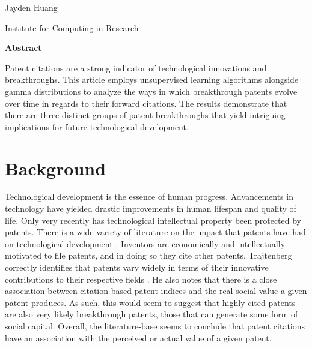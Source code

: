 \begin{center}
\vspace{4pt}
\large
    Jayden Huang
    
\small
   Institute for Computing in Research 

\end{center}



\begin{small}
\begin{center}
\vspace{9pt}
\textbf{Abstract}    
\end{center}

\begin{adjustwidth}{20pt}{20pt}
\small \noindent Patent citations are a strong indicator of technological innovations and breakthroughs. This article employs unsupervised learning algorithms alongside gamma distributions to analyze the ways in which breakthrough patents evolve over time in regards to their forward citations. The results demonstrate that there are three distinct groups of patent breakthroughs that yield intriguing implications for future technological development. 
\end{adjustwidth}


\end{small}




\vspace{10pt}
\section{Background}\label{Sec:Introduction}

Technological development is the essence of human progress. Advancements in technology have yielded drastic improvements in human lifespan and quality of life. Only very recently has technological intellectual property been protected by patents. There is a wide variety of literature on the impact that patents have had on technological development \citep{TAKALO20001105}. Inventors are economically and intellectually motivated to file patents, and in doing so they cite other patents. Trajtenberg correctly identifies that patents vary widely in terms of their innovative contributions to their respective fields \citep{trajtenberg}. He also notes that there is a close association between citation-based patent indices and the real social value a given patent produces. As such, this would seem to suggest that highly-cited patents are also very likely breakthrough patents, those that can generate some form of social capital. Overall, the literature-base seems to conclude that patent citations have an association with the perceived or actual value of a given patent. 

